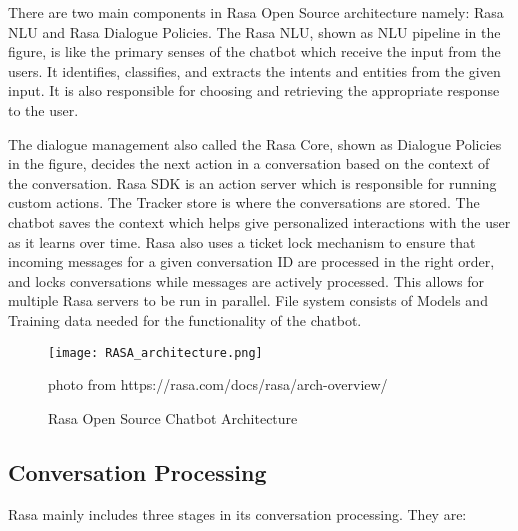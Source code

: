 There are two main components in Rasa Open Source architecture namely: Rasa NLU and Rasa Dialogue Policies. The Rasa NLU, shown as NLU pipeline in the figure, is like the primary senses of the chatbot which receive the input from the users. It identifies, classifies, and extracts the intents and entities from the given input. It is also responsible for choosing and retrieving the appropriate response to the user. 

The dialogue management also called the Rasa Core, shown as Dialogue Policies in the figure, decides the next action in a conversation based on the context of the conversation. Rasa SDK is an action server which is responsible for running custom actions. The Tracker store is where the conversations are stored. The chatbot saves the context which helps give personalized interactions with the user as it learns over time. Rasa also uses a ticket lock mechanism to ensure that incoming messages for a given conversation ID are processed in the right order, and locks conversations while messages are actively processed. This allows for multiple Rasa servers to be run in parallel. File system consists of Models and Training data needed for the functionality of the chatbot.

\begin{figure}[h]
	\centering 
	\texttt{[image: RASA\_architecture.png]}
	\caption{Rasa Open Source Chatbot Architecture}
	photo from https://rasa.com/docs/rasa/arch-overview/
	\label{fig:rasa_architecture}
\end{figure}

\subsection {Conversation Processing}

Rasa mainly includes three stages in its conversation processing. They are:

